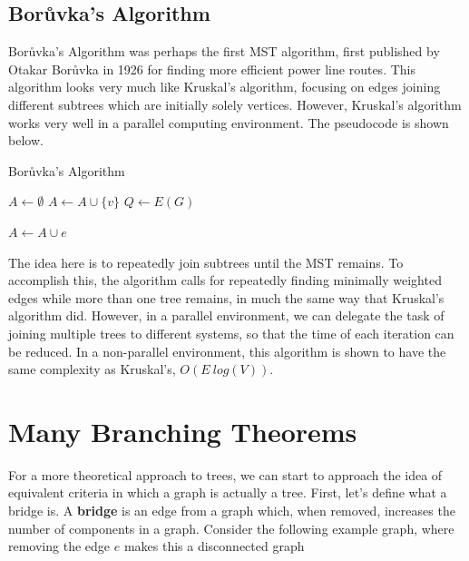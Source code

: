 \subsection{Bor\r{u}vka's Algorithm}
Bor\r{u}vka's Algorithm was perhaps the first MST algorithm, first published by Otakar Bor\r{u}vka in 1926 for finding more efficient power line routes\cite{BoruvkasAlgo}. This algorithm looks very much like Kruskal's algorithm, focusing on edges joining different subtrees which are initially solely vertices. However, Kruskal's algorithm works very well in a parallel computing environment. The pseudocode is shown below.
\begin{algorithm}
    \DontPrintSemicolon
    \caption{Bor\r{u}vka's Algorithm}


    $A \gets \emptyset$\;
     {
        $A \gets A \cup \{v\}$\;
    }
    $Q \gets E(G)$\;
     {
         {
             {
                \;
                $A \gets A \cup e$\;
            }
        }

    }
\end{algorithm}

The idea here is to repeatedly join subtrees until the MST remains. To accomplish this, the algorithm calls for repeatedly finding minimally weighted edges while more than one tree remains, in much the same way that Kruskal's algorithm did. However, in a parallel environment, we can delegate the task of joining multiple trees to different systems, so that the time of each iteration can be reduced. In a non-parallel environment, this algorithm is shown to have the same complexity as Kruskal's, $O(E~log(V))$.

\section{Many Branching Theorems}
For a more theoretical approach to trees, we can start to approach the idea of equivalent criteria in which a graph is actually a tree. First, let's define what a bridge is. A \textbf{bridge} is an edge from a graph which, when removed, increases the number of components in a graph. Consider the following example graph, where removing the edge $e$ makes this a disconnected graph

